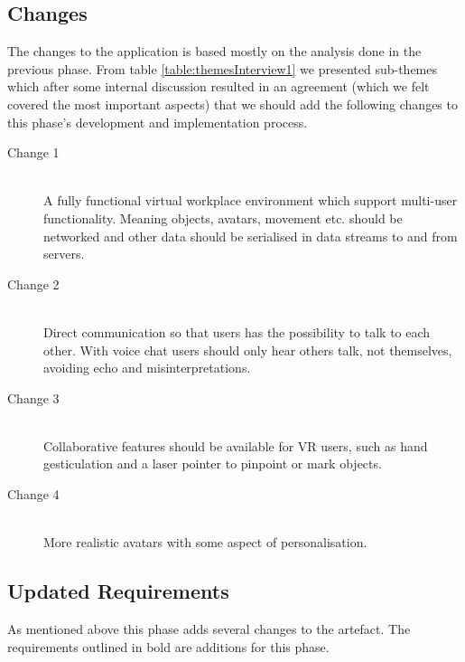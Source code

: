 \subsection{Changes}
The changes to the application is based mostly on the analysis done in the previous phase. From table \ref{table:themesInterview1} we presented sub-themes which after some internal discussion resulted in an agreement (which we felt covered the most important aspects) that we should add the following changes to this phase's development and implementation process. 

\begin{description}
    \item [Change 1]\hfill \\
    A fully functional virtual workplace environment which support multi-user functionality. Meaning objects, avatars, movement etc. should be networked and other data should be serialised in data streams to and from servers. 
    \item [Change 2]\hfill \\
    Direct communication so that users has the possibility to talk to each other. With voice chat users should only hear others talk, not themselves, avoiding echo and misinterpretations.  
    \item [Change 3]\hfill \\
    Collaborative features should be available for VR users, such as hand gesticulation and a laser pointer to pinpoint or mark objects.
    \item [Change 4]\hfill \\
    More realistic avatars with some aspect of personalisation. 
\end{description}





\subsection{Updated Requirements}
As mentioned above this phase adds several changes to the artefact. The requirements outlined in bold are additions for this phase.

